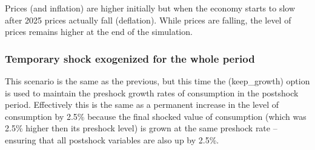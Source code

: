 \documentclass[letterpaper,10pt,english]{jupyterBook}
\begin{document}
\sphinxAtStartPar
Prices (and inflation) are higher initially but when the economy starts to slow after 2025 prices actually fall (deflation). While prices are falling, the level of prices remains higher at the end of the simulation.


\subsubsection{Temporary shock exogenized for the whole period}
\label{\detokenize{content/05_WBModels/ScenarioAnalysis:temporary-shock-exogenized-for-the-whole-period}}
\sphinxAtStartPar
This scenario is the same as the previous, but this time the  (keep\_growth) option is used to maintain the pre\sphinxhyphen{}shock growth rates of consumption in the post\sphinxhyphen{}shock period.  Effectively this is the same as a permanent increase in the level of consumption by 2.5\% because the final shocked value of consumption (which was 2.5\% higher then its pre\sphinxhyphen{}shock level) is grown at the same pre\sphinxhyphen{}shock rate – ensuring that all post\sphinxhyphen{}shock variables are also up by 2.5\%.
\end{document}
